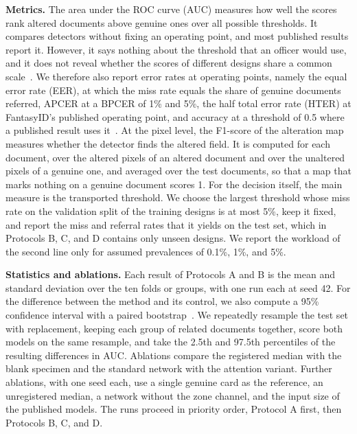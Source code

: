 \documentclass[12pt,a4paper]{article}
\begin{document}
\textbf{Metrics.} The area under the ROC curve (AUC) measures how well the scores rank altered documents above genuine ones over all possible thresholds. It compares detectors without fixing an operating point, and most published results report it. However, it says nothing about the threshold that an officer would use, and it does not reveal whether the scores of different designs share a common scale~\cite{fawcett2006roc}. We therefore also report error rates at operating points, namely the equal error rate (EER), at which the miss rate equals the share of genuine documents referred, APCER at a BPCER of 1\% and 5\%, the half total error rate (HTER) at FantasyID's published operating point, and accuracy at a threshold of 0.5 where a published result uses it~\cite{iso30107}. At the pixel level, the F1-score of the alteration map measures whether the detector finds the altered field. It is computed for each document, over the altered pixels of an altered document and over the unaltered pixels of a genuine one, and averaged over the test documents, so that a map that marks nothing on a genuine document scores 1. For the decision itself, the main measure is the transported threshold. We choose the largest threshold whose miss rate on the validation split of the training designs is at most 5\%, keep it fixed, and report the miss and referral rates that it yields on the test set, which in Protocols B, C, and D contains only unseen designs. We report the workload of the second line only for assumed prevalences of 0.1\%, 1\%, and 5\%.

\textbf{Statistics and ablations.} Each result of Protocols A and B is the mean and standard deviation over the ten folds or groups, with one run each at seed 42. For the difference between the method and its control, we also compute a 95\% confidence interval with a paired bootstrap~\cite{efron1993bootstrap}. We repeatedly resample the test set with replacement, keeping each group of related documents together, score both models on the same resample, and take the 2.5th and 97.5th percentiles of the resulting differences in AUC. Ablations compare the registered median with the blank specimen and the standard network with the attention variant. Further ablations, with one seed each, use a single genuine card as the reference, an unregistered median, a network without the zone channel, and the input size of the published models. The runs proceed in priority order, Protocol A first, then Protocols B, C, and D.
\end{document}
